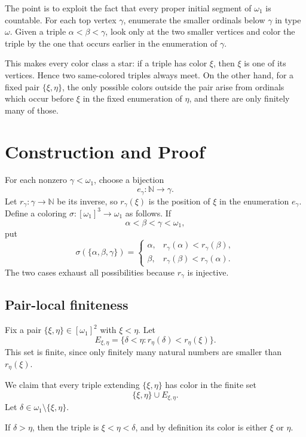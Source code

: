 \documentclass[11pt]{article}
\begin{document}
The point is to exploit the fact that every proper initial segment of \(\omega_1\) is countable.  For each top vertex \(\gamma\), enumerate the smaller ordinals below \(\gamma\) in type \(\omega\).  Given a triple \(\alpha<\beta<\gamma\), look only at the two smaller vertices and color the triple by the one that occurs earlier in the enumeration of \(\gamma\).

This makes every color class a star: if a triple has color \(\xi\), then \(\xi\) is one of its vertices.  Hence two same-colored triples always meet.  On the other hand, for a fixed pair \(\{\xi,\eta\}\), the only possible colors outside the pair arise from ordinals which occur before \(\xi\) in the fixed enumeration of \(\eta\), and there are only finitely many of those.

\section*{Construction and Proof}

For each nonzero \(\gamma<\omega_1\), choose a bijection
\[
  e_\gamma:\mathbb N\to\gamma.
\]
Let \(r_\gamma:\gamma\to\mathbb N\) be its inverse, so \(r_\gamma(\xi)\) is the position of \(\xi\) in the enumeration \(e_\gamma\).  Define a coloring \(\sigma:[\omega_1]^3\to\omega_1\) as follows.  If
\[
  \alpha<\beta<\gamma<\omega_1,
\]
put
\[
  \sigma(\{\alpha,\beta,\gamma\})=
  \begin{cases}
  \alpha, & r_\gamma(\alpha)<r_\gamma(\beta),\\
  \beta, & r_\gamma(\beta)<r_\gamma(\alpha).
  \end{cases}
\]
The two cases exhaust all possibilities because \(r_\gamma\) is injective.

\subsection*{Pair-local finiteness}

Fix a pair \(\{\xi,\eta\}\in[\omega_1]^2\) with \(\xi<\eta\).  Let
\[
  E_{\xi,\eta}=\{\delta<\eta:r_\eta(\delta)<r_\eta(\xi)\}.
\]
This set is finite, since only finitely many natural numbers are smaller than \(r_\eta(\xi)\).

We claim that every triple extending \(\{\xi,\eta\}\) has color in the finite set
\[
  \{\xi,\eta\}\cup E_{\xi,\eta}.
\]
Let \(\delta\in\omega_1\setminus\{\xi,\eta\}\).

If \(\delta>\eta\), then the triple is \(\xi<\eta<\delta\), and by definition its color is either \(\xi\) or \(\eta\).
\end{document}
